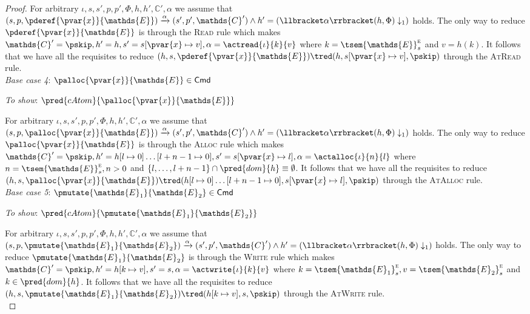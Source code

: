 \begin{lem}
{\begin{proof}
	For arbitrary $\iota, s, s', p, p', \Phi, h, h', \mathds{C}', \alpha$ we assume that $(s, p, \pderef{\pvar{x}}{\mathds{E}}) \xrightarrow{\alpha} (s', p', \mathds{C}') \land h' = \left( \llbracket \alpha \rrbracket(h, \Phi) \downarrow_1 \right)$ holds. The only way to reduce $\pderef{\pvar{x}}{\mathds{E}}$ is through the \textsc{Read} rule which makes $\mathds{C}' = \pskip, h' = h, s' = s[\pvar{x} \mapsto v], \alpha = \actread{\iota}{k}{v}$ where $k = \tsem{\mathds{E}}_s^\textsc{e}$ and $v = h(k)$. It follows that we have all the requisites to reduce $(h, s, \pderef{\pvar{x}}{\mathds{E}}) \tred (h, s[\pvar{x} \mapsto v], \pskip)$ through the \textsc{AtRead} rule. \\
	
	\textit{Base case 4}: $\palloc{\pvar{x}}{\mathds{E}} \in \mathsf{Cmd}$
	
	\textit{To show}: $\pred{cAtom}{\palloc{\pvar{x}}{\mathds{E}}}$
	
	For arbitrary $\iota, s, s', p, p', \Phi, h, h', \mathds{C}', \alpha$ we assume that $(s, p, \palloc{\pvar{x}}{\mathds{E}}) \xrightarrow{\alpha} (s', p', \mathds{C}') \land h' = \left( \llbracket \alpha \rrbracket(h, \Phi) \downarrow_1 \right)$ holds. The only way to reduce $\palloc{\pvar{x}}{\mathds{E}}$ is through the \textsc{Alloc} rule which makes $\mathds{C}' = \pskip, h' = h[l \mapsto 0]\ldots[l + n - 1 \mapsto 0], s' = s[\pvar{x} \mapsto l], \alpha = \actalloc{\iota}{n}{l}$ where $n = \tsem{\mathds{E}}_s^\textsc{e}, n > 0$ and $\{ l, \ldots, l + n - 1\} \cap \pred{dom}{h} \equiv \emptyset$. It follows that we have all the requisites to reduce $(h, s, \palloc{\pvar{x}}{\mathds{E}}) \tred (h[l \mapsto 0]\ldots[l + n - 1 \mapsto 0], s[\pvar{x} \mapsto l], \pskip)$ through the \textsc{AtAlloc} rule. \\
	
	\textit{Base case 5}: $\pmutate{\mathds{E}_1}{\mathds{E}_2} \in \mathsf{Cmd}$
	
	\textit{To show}: $\pred{cAtom}{\pmutate{\mathds{E}_1}{\mathds{E}_2}}$
	
	For arbitrary $\iota, s, s', p, p', \Phi, h, h', \mathds{C}', \alpha$ we assume that $(s, p, \pmutate{\mathds{E}_1}{\mathds{E}_2}) \xrightarrow{\alpha} (s', p', \mathds{C}') \land h' = \left( \llbracket \alpha \rrbracket(h, \Phi) \downarrow_1 \right)$ holds. The only way to reduce $\pmutate{\mathds{E}_1}{\mathds{E}_2}$ is through the \textsc{Write} rule which makes $\mathds{C}' = \pskip, h' = h[k \mapsto v], s' = s, \alpha = \actwrite{\iota}{k}{v}$ where $k = \tsem{\mathds{E}_1}_s^\textsc{e}, v = \tsem{\mathds{E}_2}_s^\textsc{e}$ and $k \in \pred{dom}{h}$. It follows that we have all the requisites to reduce $(h, s, \pmutate{\mathds{E}_1}{\mathds{E}_2}) \tred (h[k \mapsto v], s, \pskip)$ through the \textsc{AtWrite} rule. \\
	

\end{proof}}
\end{lem}
